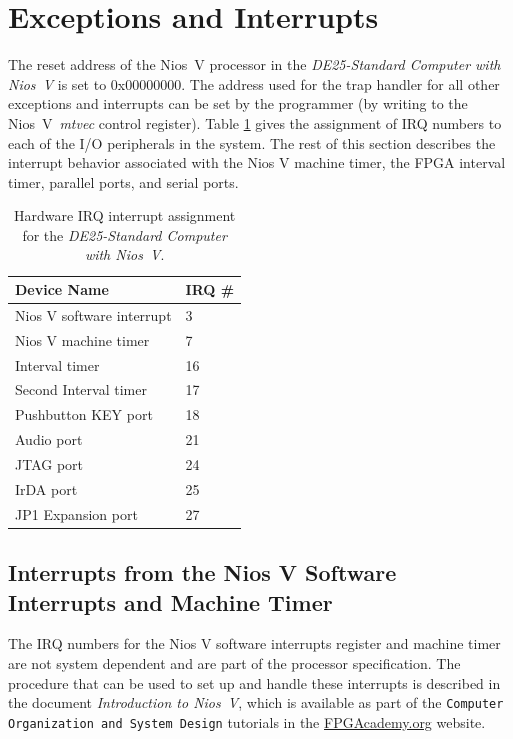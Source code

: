 \documentclass[11pt, twoside, pdftex]{article}
\newcommand{\systemNameFull}{DE25-Standard Computer with Nios~V}
\newcommand{\processor}{Nios~V}
\begin{document}
\newpage
\section{Exceptions and Interrupts}
\label{sec:exceptions}

The reset address of the {\processor} processor in the {\it \systemNameFull} is set to
{\sf 0x00000000}. The address used for the trap handler for all other exceptions and 
interrupts can be set by the programmer (by writing to the \processor~{\it mtvec} 
control register). 
Table \ref{tab:irq} gives the assignment of IRQ numbers to each of the I/O peripherals in 
the system. The rest of this section describes the interrupt behavior associated 
with the Nios V machine timer, the FPGA interval timer, parallel ports, and serial ports.

\begin{table}[h]
    \begin{center}
    \begin{tabular}{l|l}
            \textbf{Device Name} &
            \textbf{IRQ \#}
        \\\hline
            Nios V software interrupt & 3 \\
            Nios V machine timer & 7 \\
            Interval timer & 16 \\
            Second Interval timer & 17 \\
            Pushbutton KEY port & 18 \\
            Audio port & 21 \\
            JTAG port & 24 \\
			IrDA port & 25 \\
            JP1 Expansion port & 27 \\
    \end{tabular}
    \caption{Hardware IRQ interrupt assignment for the {\it \systemNameFull}.}
	 \label{tab:irq}
    \end{center}
\end{table}

\subsection{Interrupts from the Nios V Software Interrupts and Machine Timer}
The IRQ numbers for the Nios V software interrupts register and machine timer are not
system dependent and are part of the processor specification. The procedure that can be used
to set up and handle these interrupts is described in the 
document {\it Introduction to \processor}, which is available as part of the 
\texttt{Computer Organization and System Design} tutorials in the 
{\small \href{https://www.fpgacademy.org/tutorials.html} {FPGAcademy.org}} website.
\end{document}

